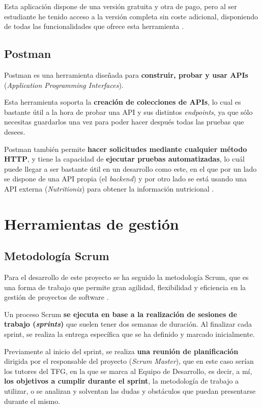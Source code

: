 Esta aplicación dispone de una versión gratuita y otra de pago, pero al ser estudiante he tenido acceso a la versión completa sin coste adicional, disponiendo de todas las funcionalidades que ofrece esta herramienta \cite{jetbrains:students}.

\subsection{Postman}

Postman es una herramienta diseñada para \textbf{construir, probar y usar APIs} (\textit{Application Programming Interfaces}).

Esta herramienta soporta la \textbf{creación de colecciones de APIs}, lo cual es bastante útil a la hora de probar una API y sus distintos \textit{endpoints}, ya que sólo necesitas guardarlos una vez para poder hacer después todas las pruebas que desees.

Postman también permite\textbf{ hacer solicitudes mediante cualquier método HTTP}, y tiene la capacidad de \textbf{ejecutar pruebas automatizadas}, lo cuál puede llegar a ser bastante útil en un desarrollo como este, en el que por un lado se dispone de una API propia (el \textit{backend}) y por otro lado se está usando una API externa (\textit{Nutritionix}) para obtener la información nutricional \cite{postman:main}.


\section{Herramientas de gestión}

\subsection{Metodología Scrum}

Para el desarrollo de este proyecto se ha seguido la metodología Scrum, que es una forma de trabajo que permite gran agilidad, flexibilidad y eficiencia en la gestión de proyectos de software \cite{atlassian:scrum}.

Un proceso Scrum \textbf{se ejecuta en base a la realización de sesiones de trabajo (\textit{sprints})} que suelen tener dos semanas de duración. Al finalizar cada sprint, se realiza la entrega específica que se ha definido y marcado inicialmente.

Previamente al inicio del sprint, se realiza \textbf{una reunión de planificación} dirigida por el responsable del proyecto (\textit{Scrum Master}), que en este caso serían los tutores del TFG, en la que se marca al Equipo de Desarrollo, es decir, a mí, \textbf{los objetivos a cumplir durante el sprint}, la metodología de trabajo a utilizar, o se analizan y solventan las dudas y obstáculos que puedan presentarse durante el mismo.

